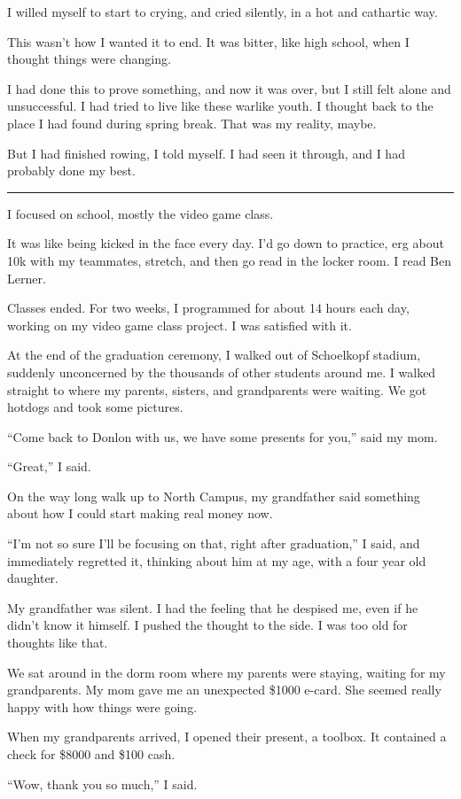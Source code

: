 I willed myself to start to crying, and cried silently, in a hot and cathartic
way.  

This wasn't how I wanted it to end.  It was bitter, like high school, when I
thought things were changing.  

I had done this to prove something, and now it was over, but I still felt alone
and unsuccessful.  I had tried to live like these warlike youth.  I thought back
to the place I had found during spring break.  That was my reality, maybe.

But I had finished rowing, I told myself.  I had seen it through, and I had
probably done my best.

\plainfancybreak{12pt}{2}{}

I focused on school, mostly the video game class.

It was like being kicked in the face every day.  I'd go down to practice, erg
about 10k with my teammates, stretch, and then go read in the locker room.  I
read Ben Lerner.

Classes ended.  For two weeks, I programmed for about 14 hours each day, working
on my video game class project.  I was satisfied with it.

At the end of the graduation ceremony, I walked out of Schoelkopf stadium,
suddenly unconcerned by the thousands of other students around me.  I walked
straight to where my parents, sisters, and grandparents were waiting.  We got
hotdogs and took some pictures.  

``Come back to Donlon with us, we have some presents for you,'' said my mom. 

``Great,'' I said.

On the way long walk up to North Campus, my grandfather said something about how
I could start making real money now.

``I'm not so sure I'll be focusing on that, right after graduation,'' I said,
and immediately regretted it, thinking about him at my age, with a four year old
daughter.  

My grandfather was silent.  I had the feeling that he despised me, even if he
didn't know it himself.  I pushed the thought to the side.  I was too old for
thoughts like that.

We sat around in the dorm room where my parents were staying, waiting for my
grandparents.  My mom gave me an unexpected \$1000 e-card.  She seemed really
happy with how things were going.

When my grandparents arrived, I opened their present, a toolbox.  It contained a
check for \$8000 and \$100 cash.

``Wow, thank you so much,'' I said.
